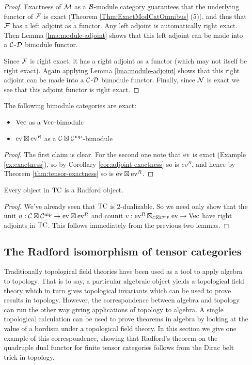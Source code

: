 \documentclass{amsart}
\begin{document}
\begin{proof}
Exactness of $\cM$ as a $\cB$-module category guarantees that the underlying functor of $\cF$ is exact (Theorem \ref{Thm:ExactModCatOmnibus} (5)), and thus that $\cF$ has a left adjoint as a functor.  Any left adjoint is automatically right exact.  Then Lemma \ref{lma:module-adjoint} shows that this left adjoint can be made into a $\cC$-$\cD$ bimodule functor.   

Since $\cF$ is right exact, it has a right adjoint as a functor (which may not itself be right exact).  Again applying Lemma \ref{lma:module-adjoint} shows that this right adjoint can be made into a $\cC$-$\cD$ bimodule functor.   Finally, since $\cN$ is exact we see that this adjoint functor is right exact.
\end{proof}

\begin{lemma}
The following bimodule categories are exact:
\begin{itemize}
\item $\Vec$ as a $\Vec$-bimodule
\item $\ev \boxtimes \ev^R$ as a $\cC \boxtimes \cC^\mp$-bimodule
\end{itemize}
\end{lemma}
\begin{proof}
The first claim is clear.  For the second one note that $\ev$ is exact (Example \ref{ex:exactness}), so by Corollary \ref{cor:adjoint-exactness} so is $ev^R$, and hence by Theorem \ref{thm:tensor-exactness} so is $\ev \boxtimes \ev^R$.
\end{proof}

\begin{theorem}
Every object in $\TC$ is a Radford object.
\end{theorem}
\begin{proof}
We've already seen that $\TC$ is $2$-dualizable.  So we need only show that the unit $u: \cC \boxtimes \cC^\mp \rightarrow \ev \boxtimes \ev^R$ and counit $v: \ev^R \boxtimes_{\cC \boxtimes \cC^\mp} \ev \rightarrow \Vec$ have right adjoints in $\TC$.  This follows immediately from the previous two lemmas.
\end{proof}

\subsection{The Radford isomorphism of tensor categories}

Traditionally topological field theories have been used as a tool to apply algebra to topology.  That is to say, a particular algebraic object yields a topological field theory which in turn gives topological invariants which can be used to prove results in topology.  However, the correspondence between algebra and topology can run the other way giving applications of topology to algebra.  A single topological calculation can be used to prove theorems in algebra by looking at the value of a bordism under a topological field theory.  In this section we give one example of this correspondence, showing that Radford's theorem on the quadruple dual functor for finite tensor categories follows from the Dirac belt trick in topology.
\end{document}
